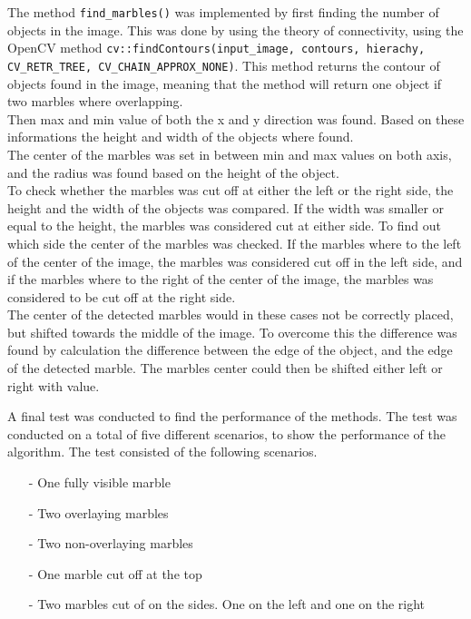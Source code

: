 \documentclass[../Head/Main.tex]{subfiles}
\begin{document}
The method \texttt{find\_marbles()} was implemented by first finding the number of objects in the image. This was done by using the theory of connectivity, using the OpenCV method \texttt{cv::findContours(input\_image, contours, hierachy, CV\_RETR\_TREE, CV\_CHAIN\_APPROX\_NONE)}. This method returns the contour of objects found in the image, meaning that the method will return one object if two marbles where overlapping.\\
Then max and min value of both the x and y direction was found. Based on these informations the height and width of the objects where found.\\
The center of the marbles was set in between min and max values on both axis, and the radius was found based on the height of the object.\\
To check whether the marbles was cut off at either the left or the right side, the height and the width of the objects was compared. If the width was smaller or equal to the height, the marbles was considered cut at either side. To find out which side the center of the marbles was checked. If the marbles where to the left of the center of the image, the marbles was considered cut off in the left side, and if the marbles where to the right of the center of the image, the marbles was considered to be cut off at the right side.\\
The center of the detected marbles would in these cases not be correctly placed, but shifted towards the middle of the image. To overcome this the difference was found by calculation the difference between the edge of the object, and the edge of the detected marble. The marbles center could then be shifted either left or right with value.\par 
A final test was conducted to find the performance of the methods. The test was conducted on a total of five different scenarios, to show the performance of the algorithm. The test consisted of the following scenarios.
\begin{itemize}
	\item[-] One fully visible marble \vspace{-7pt}
	\item[-] Two overlaying marbles \vspace{-7pt}
	\item[-] Two non-overlaying marbles \vspace{-7pt}
	\item[-] One marble cut off at the top \vspace{-7pt}
	\item[-] Two marbles cut of on the sides. One on the left and one on the right
\end{itemize} 
\end{document}
